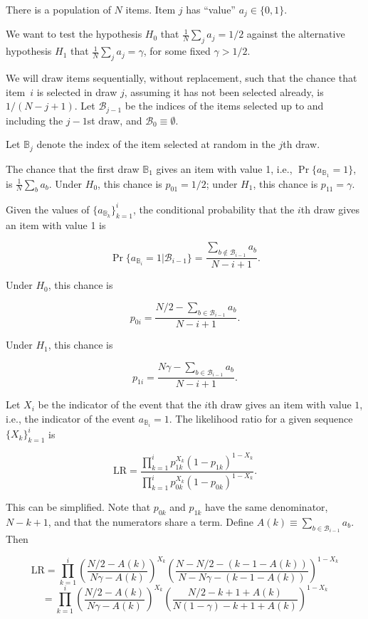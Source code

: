 \documentclass[12pt]{article}
\begin{document}
There is a population of $N$ items. 
Item $j$ has ``value'' $a_j \in \{0, 1\}$. 

We want to test the hypothesis $H_0$ that $\frac{1}{N}\sum_j a_j = 1/2$ against the
alternative hypothesis $H_1$ that $\frac{1}{N}\sum_j a_j = \gamma$, for some
fixed $\gamma > 1/2$.

We will draw items sequentially, without replacement, such that the chance that 
item~$i$ is selected in draw $j$, assuming it has not been selected already, is $1/(N-j+1)$.
Let ${\mathcal B_{j-1}}$ be the indices of the items selected up to and including the $j-1$st draw,
and ${\mathcal B_0} \equiv \emptyset$. 

Let $\mathbb B_j$ denote the index of the item selected at random in the $j$th draw.

The chance that the first draw ${\mathbb B_1}$ gives an item with value 1, i.e., 
$\Pr \{a_{\mathbb B_1} = 1\}$, is $\frac{1}{N}\sum_b a_b$.
Under $H_0$, this chance is $p_{01} = 1/2$; under $H_1$, this chance is 
$p_{11} = \gamma$.

Given the values of $\{a_{\mathbb B_k}\}_{k=1}^i$, the conditional
probability that the $i$th draw gives an item with value 1 is

$$
   \Pr \{a_{\mathbb B_i} = 1 | {\mathcal B_{i-1}} \} = \frac{ \sum_{b \notin {\mathcal B_{i-1}}} a_b}{N-i+1}.
$$

Under $H_0$, this chance is

$$
   p_{0i} =  \frac{N/2 - \sum_{b \in {\mathcal B_{i-1}}} a_b}{N - i + 1}.
$$

Under $H_1$, this chance is

$$
   p_{1i} = \frac{N \gamma - \sum_{b \in {\mathcal B_{i-1}}} a_b}{N - i+1}.
$$

Let $X_i$ be the indicator of the event that the $i$th draw gives an item with
value $1$, i.e., the indicator of the event $a_{\mathbb B_i} = 1$.
The likelihood ratio for a given sequence $\{X_k\}_{k=1}^i$ is

$$
    \mbox{LR} = \frac{\prod_{k=1}^i p_{1k}^{X_k}(1-p_{1k})^{1-X_k}}
         {\prod_{k=1}^i p_{0k}^{X_k}(1-p_{0k})^{1-X_k}}.
$$

This can be simplified. 
Note that $p_{0k}$ and $p_{1k}$ have the same denominator,
$N - k + 1$, and that the numerators share a term.
Define $A(k) \equiv \sum_{b \in {\mathcal B_{i-1}}} a_b$.
Then

$$
    \mbox{LR} = \prod_{k=1}^i 
    \left ( \frac{N/2 - A(k)}{N\gamma - A(k)} \right )^{X_k}
    \left ( \frac{N-N/2 - (k-1-A(k))}{N-N\gamma - (k - 1 - A(k))} \right )^{1-X_k}
$$
$$
   = \prod_{k=1}^i  \left ( \frac{N/2 - A(k)}{N\gamma - A(k)} \right )^{X_k}
    \left ( \frac{N/2 - k + 1 + A(k)}{N(1-\gamma) - k + 1 + A(k)} \right )^{1-X_k}
$$
\end{document}
